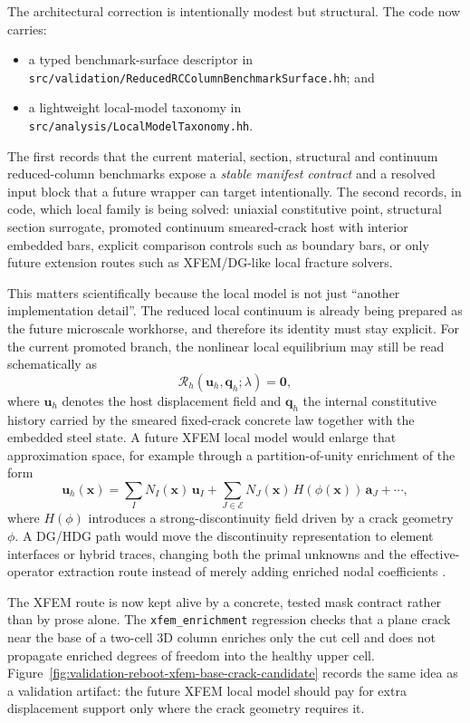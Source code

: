 The architectural correction is intentionally modest but structural. The code
now carries:
\begin{itemize}
  \item a typed benchmark-surface descriptor in
    \texttt{src/validation/ReducedRCColumnBenchmarkSurface.hh}; and
  \item a lightweight local-model taxonomy in
    \texttt{src/analysis/LocalModelTaxonomy.hh}.
\end{itemize}
The first records that the current material, section, structural and continuum
reduced-column benchmarks expose a \emph{stable manifest contract} and a
resolved input block that a future wrapper can target intentionally. The
second records, in code, which local family is being solved: uniaxial
constitutive point, structural section surrogate, promoted continuum
smeared-crack host with interior embedded bars, explicit comparison controls
such as boundary bars, or only future extension routes such as XFEM/DG-like
local fracture solvers.

This matters scientifically because the local model is not just ``another
implementation detail''. The reduced local continuum is already being prepared
as the future microscale workhorse, and therefore its identity must stay
explicit. For the current promoted branch, the nonlinear local equilibrium may
still be read schematically as
\[
  \mathcal{R}_h(\mathbf{u}_h,\mathbf{q}_h;\lambda)=\mathbf{0},
\]
where \(\mathbf{u}_h\) denotes the host displacement field and
\(\mathbf{q}_h\) the internal constitutive history carried by the smeared
fixed-crack concrete law together with the embedded steel state. A future XFEM
local model would enlarge that approximation space, for example through a
partition-of-unity enrichment of the form \cite{BelytschkoBlack1999,MoesDolbowBelytschko1999}
\[
  \mathbf{u}_h(\mathbf{x}) =
  \sum_{I} N_I(\mathbf{x})\,\mathbf{u}_I
  +
  \sum_{J \in \mathcal{E}} N_J(\mathbf{x})\,H(\phi(\mathbf{x}))\,\mathbf{a}_J
  + \cdots,
\]
where \(H(\phi)\) introduces a strong-discontinuity field driven by a crack
geometry \(\phi\). A DG/HDG path would move the discontinuity representation to
element interfaces or hybrid traces, changing both the primal unknowns and the
effective-operator extraction route instead of merely adding enriched nodal
coefficients \cite{DemkowiczGopalakrishnan2010}.

The XFEM route is now kept alive by a concrete, tested mask contract rather
than by prose alone. The \texttt{xfem\_enrichment} regression checks that a
plane crack near the base of a two-cell 3D column enriches only the cut cell
and does not propagate enriched degrees of freedom into the healthy upper
cell. Figure~\ref{fig:validation-reboot-xfem-base-crack-candidate} records the
same idea as a validation artifact: the future XFEM local model should pay for
extra displacement support only where the crack geometry requires it.

